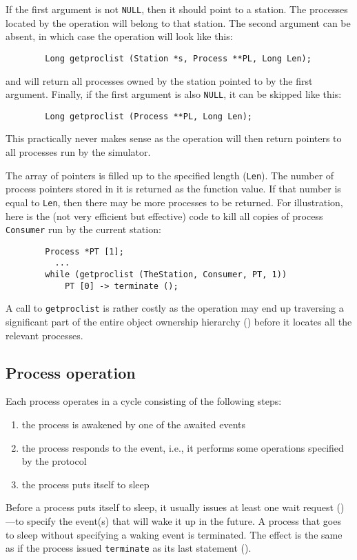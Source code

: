 If the first argument is not {\tt NULL}, then it should point to a station.
The processes located by the operation will belong to that station.
The second argument can be absent, in which case the operation will look like
this:
\begin{verbatim}
        Long getproclist (Station *s, Process **PL, Long Len);
\end{verbatim}
and will return all processes owned by the station pointed to by the first
argument.
Finally, if the first argument is also {\tt NULL}, it can be skipped like
this:
\begin{verbatim}
        Long getproclist (Process **PL, Long Len);
\end{verbatim}
This practically never makes sense as
the operation will then return pointers to all processes run by the
simulator.

The array of pointers is filled up to the specified length
({\tt Len}).
The number of process pointers stored in it is returned as the function value.
If that number is equal to {\tt Len}, then there may be more processes to
be returned.
For illustration, here is the (not very efficient but effective)
code to kill all copies of process {\tt Consumer} run by the current station:
\begin{verbatim}
        Process *PT [1];
          ...
        while (getproclist (TheStation, Consumer, PT, 1))
            PT [0] -> terminate ();
\end{verbatim}
\noindent
A call to {\tt getproclist} is rather costly as the operation may end up
traversing a significant part of the entire object ownership hierarchy
() before it locates all the relevant processes.

\subsection{Process operation}
\label{rm_pr_po}

Each process operates in a cycle consisting of the following steps:
\begin{enumerate}
\item
the process is awakened by one of the awaited events
\item
the process responds to the event, i.e., it performs some operations
specified by the protocol
\item
the process puts itself to sleep
\end{enumerate}

Before a process puts itself to sleep, it usually issues at least one
wait request ()---to specify the event(s) that will wake
it up in the future.
A process that goes to sleep without specifying a waking event is terminated.
The effect is the same
as if the process issued {\tt terminate} as its last
statement ().

